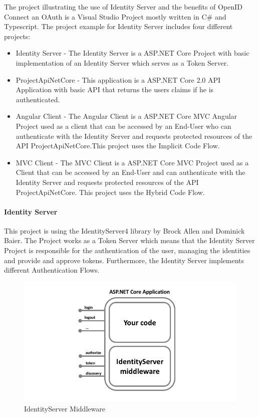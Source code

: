 The project illustrating the use of Identity Server and the benefits of OpenID Connect an OAuth is a Visual Studio Project mostly written in C\# and Typescript. The project example for Identity Server includes four different projects:

\begin{itemize}
	\item Identity Server - The Identity Server is a ASP.NET Core Project with basic implementation of an Identity Server which serves as a Token Server. 
	\item ProjectApiNetCore - This application is a ASP.NET Core 2.0 API Application with basic API that returns the users claims if he is authenticated.
	\item Angular Client - The Angular Client is a ASP.NET Core MVC Angular Project used as a client that can be accessed by an End-User who can authenticate with the Identity Server and requests protected resources of the API ProjectApiNetCore.This project uses the Implicit Code Flow. 
	\item MVC Client - The MVC Client is a ASP.NET Core MVC Project used as a Client that can be accessed by an End-User and can authenticate with the Identity Server and requests protected resources of the API ProjectApiNetCore. This project uses the Hybrid Code Flow. 
\end{itemize}



\paragraph{Identity Server}

This project is using the IdentityServer4 library by Brock Allen and Dominick Baier. The Project works as a Token Server which means that the Identity Server Project is responsible for the authentication of the user, managing the identities and provide and approve tokens. Furthermore, the Identity Server implements different Authentication Flows.


\begin{figure}[h]
	\centering
	\includegraphics[width=0.8\linewidth]{images/middlewareIdentityServer}
	\caption{IdentityServer Middleware}
	\label{fig:middlewareidentityserver}
\end{figure}
 

